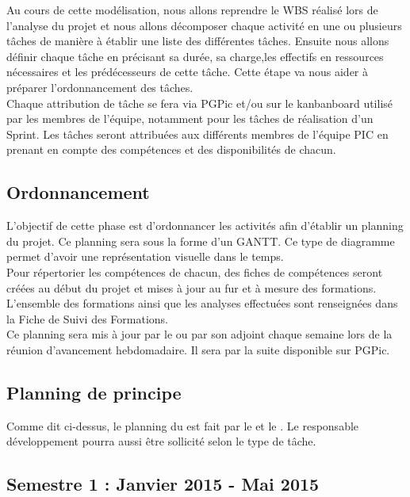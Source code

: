 Au cours de cette modélisation, nous allons reprendre le WBS réalisé lors de l’analyse du projet et nous allons décomposer chaque activité en une ou plusieurs tâches de manière à établir une liste des différentes tâches. Ensuite nous allons définir chaque tâche en précisant sa durée, sa charge,les effectifs en ressources nécessaires et les prédécesseurs de cette tâche. Cette étape va nous aider à préparer l’ordonnancement des tâches.\\

Chaque attribution de tâche se fera via PGPic et/ou sur le kanbanboard utilisé par les membres de l'équipe, notamment pour les tâches de réalisation d’un Sprint. Les tâches seront attribuées aux différents membres de l’équipe PIC en prenant en compte des compétences et des disponibilités de chacun.

\subsection{Ordonnancement}

L'objectif de cette phase est d'ordonnancer les activités afin d'établir un planning du projet. Ce planning sera sous la forme d'un GANTT. Ce type de diagramme permet d’avoir une représentation visuelle dans le temps.\\

Pour répertorier les compétences de chacun, des fiches de compétences seront créées au début du projet et mises à jour au fur et à mesure des formations. L’ensemble des formations ainsi que les analyses effectuées sont renseignées dans la Fiche de Suivi des Formations.\\ 

Ce planning sera mis à jour par le \CP ou par son adjoint chaque semaine lors de la réunion d’avancement hebdomadaire. Il sera par la suite disponible sur PGPic.


\subsection{Planning de principe}

Comme dit ci-dessus, le planning du \PICCourt est fait par le \CP et le \CPA. Le responsable développement pourra aussi être sollicité selon le type de tâche.

\subsection*{Semestre 1 : Janvier 2015 - Mai 2015}

